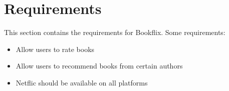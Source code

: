 \chapter*{Requirements}
This section contains the requirements for Bookflix. Some requirements:
\begin{itemize}
 \item Allow users to rate books
 \item Allow users to recommend books from certain authors
 \item Netflic should be available on all platforms
\end{itemize}
